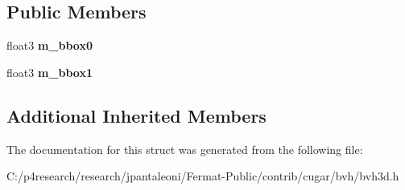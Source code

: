 \subsection*{Public Members}
\begin{DoxyCompactItemize}
\item 
\mbox{\label{structsandbox_1_1_bvh__node_3_01_compact__bvh__3d__tag_01_4_aacb544605195bac351c62e16c9e1be29}} 
float3 {\bfseries m\+\_\+bbox0}
\item 
\mbox{\label{structsandbox_1_1_bvh__node_3_01_compact__bvh__3d__tag_01_4_a6385d0d701ee8521484487f330159e92}} 
float3 {\bfseries m\+\_\+bbox1}
\end{DoxyCompactItemize}
\subsection*{Additional Inherited Members}


The documentation for this struct was generated from the following file\+:\begin{DoxyCompactItemize}
\item 
C\+:/p4research/research/jpantaleoni/\+Fermat-\/\+Public/contrib/cugar/bvh/bvh3d.\+h\end{DoxyCompactItemize}
